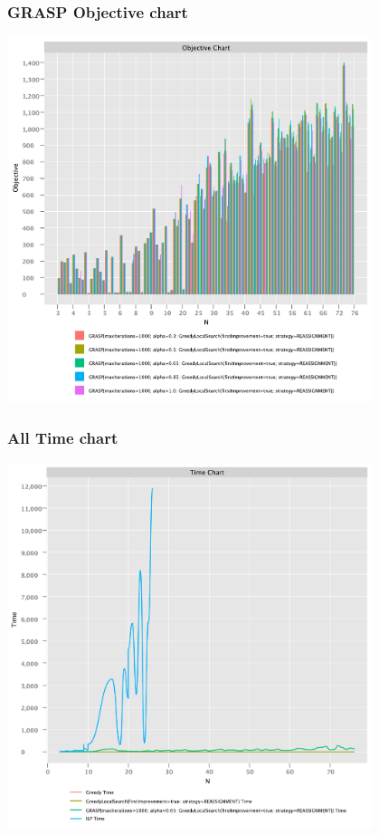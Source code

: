 \documentclass{beamer}
\begin{document}
\begin{frame}
\frametitle{GRASP Objective chart}
\includegraphics[width=0.8\textwidth]{./documentation/assets/GRASPParams.objectiveChart.pdf}
\end{frame}

\begin{frame}
\frametitle{All Time chart}
\includegraphics[width=0.8\textwidth]{./documentation/assets/all.timeChart.pdf}
\end{frame}
\end{document}
